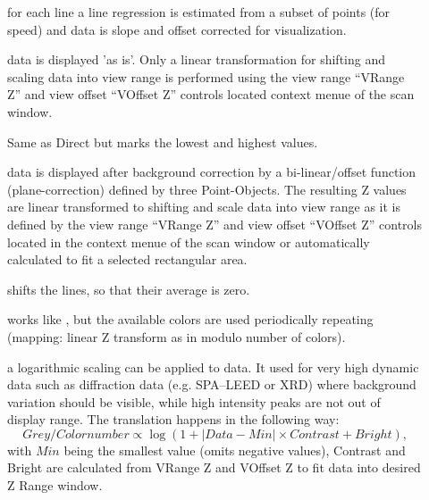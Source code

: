 
\begin{description}
\item[] for each line a line regression is estimated
  from a subset of points (for speed) and data is slope and offset
  corrected for visualization.

\item[] data is displayed 'as is'. Only a linear
  transformation for shifting and scaling data into view range is
  performed using the view range ``VRange Z'' and view offset
  ``VOffset Z'' controls located context menue of the scan window.

\item[] Same as Direct but marks the lowest and highest values.

\item[] data is displayed after background correction
  by a bi-linear/offset function (plane-correction) defined by three
  Point-Objects. The resulting Z values are linear transformed to
  shifting and scale data into view range as it is defined by the view
  range ``VRange Z'' and view offset ``VOffset Z'' controls located in
  the context menue of the scan window or automatically calculated to fit a selected rectangular area.
  
\item[] shifts the lines, so that their average is zero.

\item[] works like , but the available
colors are used periodically repeating (mapping: linear Z transform
as in  modulo number of colors). 

\item[] a logarithmic scaling can be applied to data.
  It used for very high dynamic data such as diffraction data (e.g.
  SPA--LEED or XRD) where background variation should be visible,
  while high intensity peaks are not out of display range. The
  translation happens in the following way:
\begin{displaymath}
  Grey/Colornumber \propto \log \left( 1 + \left| Data - Min \right| \times Contrast +
    Bright \right) \mbox{,}
\end{displaymath}
with $Min$ being the smallest value (omits negative values), Contrast
and Bright are calculated from VRange Z and VOffset Z to fit data into
desired Z Range window.


\end{description}
